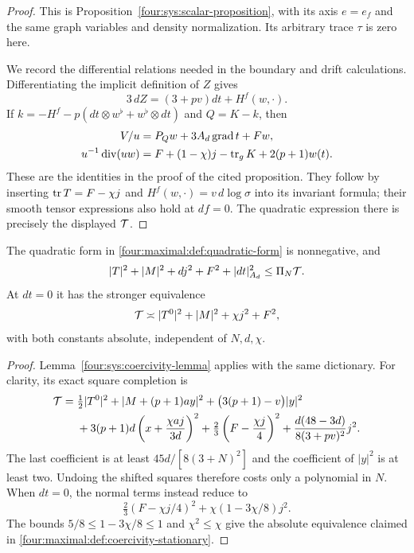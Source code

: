 \begin{proof}
This is Proposition~\ref{four:sys:scalar-proposition}, with its axis
$e=e_f$ and the same graph variables and density normalization.
Its arbitrary trace $\tau$ is zero here.

We record the differential relations needed in the boundary and drift
calculations.  Differentiating the implicit definition of $Z$ gives
\begin{equation}\label{four:maximal:def:Z-differential}
 3\,dZ=(3+pv)dt+H^f(w,\cdot).
\end{equation}
If $k=-H^f-p(dt\otimes w^\flat+w^\flat\otimes dt)$ and $Q=K-k$, then
\begin{align}
 V/u&=P_Qw+3A_d\operatorname{grad} t+Fw,
                    \label{four:maximal:def:flux-rewrite}\\
 u^{-1}\operatorname{div}(uw)
 &=F+(1-\chi)j-\operatorname{tr}_gK+2(p+1)w(t).
                    \label{four:maximal:def:w-divergence}
\end{align}
These are the identities in the proof of the cited proposition.
They follow by inserting $\operatorname{tr} T=F-\chi j$ and
$H^f(w,\cdot)=v\,d\log\sigma$ into its invariant formula; their
smooth tensor expressions also hold at $df=0$.  The quadratic expression
there is precisely the displayed $\mathcal T$.
\end{proof}

\begin{lemma}\label{four:maximal:lem:coercivity}
The quadratic form in \eqref{four:maximal:def:quadratic-form} is nonnegative, and
\begin{equation}\label{four:maximal:def:coercivity}
 |T|^2+|M|^2+dj^2+F^2+|dt|_{A_d}^2\le\Pi_N\mathcal T.
\end{equation}
At $dt=0$ it has the stronger equivalence
\begin{equation}\label{four:maximal:def:coercivity-stationary}
 \mathcal T\asymp |T^0|^2+|M|^2+\chi j^2+F^2,
\end{equation}
with both constants absolute, independent of $N,d,\chi$.
\end{lemma}

\begin{proof}
Lemma~\ref{four:sys:coercivity-lemma} applies with the same dictionary.
For clarity, its exact square completion is
\begin{align}\label{four:maximal:def:square-completion}
 \mathcal T={}&\tfrac12|T^0|^2+|M+(p+1)ay|^2
       +\bigl(3(p+1)-v\bigr)|y|^2\notag\\
 &+3(p+1)d\left(x+\frac{\chi aj}{3d}\right)^2
       +\tfrac23\left(F-\frac{\chi j}{4}\right)^2
       +\frac{d(48-3d)}{8(3+pv)^2}j^2.
\end{align}
The last coefficient is at least $45d/[8(3+N)^2]$ and the coefficient
of $|y|^2$ is at least two.  Undoing the shifted squares therefore
costs only a polynomial in $N$.  When $dt=0$, the normal terms instead
reduce to
\[
 \tfrac23(F-\chi j/4)^2+\chi(1-3\chi/8)j^2.
\]
The bounds $5/8\le1-3\chi/8\le1$ and $\chi^2\le\chi$ give the
absolute equivalence claimed in \eqref{four:maximal:def:coercivity-stationary}.
\end{proof}

